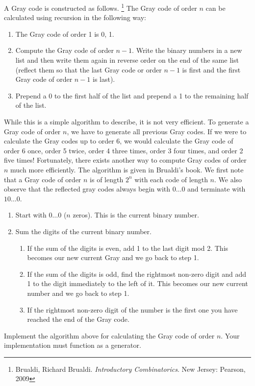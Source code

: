 A Gray code is constructed as follows.
\footnote{Brualdi, Richard Brualdi. \emph{Introductory Combinatorics}. New Jersey: Pearson, 2009}
The Gray code of order $n$ can be calculated using recursion in the following way:
\begin{enumerate}
\item The Gray code of order 1 is 0, 1.
\item Compute the Gray code of order $n-1$.  Write the binary numbers in a new list and then write them again in reverse order on the end of the same list (reflect them so that the last Gray code or order $n-1$ is first and the first Gray code of order $n-1$ is last).
\item Prepend a 0 to the first half of the list and prepend a 1 to the remaining half of the list.
\end{enumerate}
While this is a simple algorithm to describe, it is not very efficient.  
To generate a Gray code of order $n$, we have to generate all previous Gray codes.
If we were to calculate the Gray codes up to order 6, we would calculate the Gray code of order 6 once, order 5 twice, order 4 three times, order 3 four times, and order 2 five times!
Fortunately, there exists another way to compute Gray codes of order $n$ much more efficiently.
The algorithm is given in Brualdi's book.  
We first note that a Gray code of order $n$ is of length $2^n$ with each code of length $n$.
We also observe that the reflected gray codes always begin with $0\dots0$ and terminate with $10\dots0$.
\begin{enumerate}
\item Start with $0\dots0$ ($n$ zeros).  This is the current binary number.
\item Sum the digits of the current binary number.
\begin{enumerate}
\item If the sum of the digits is even, add 1 to the last digit mod 2.
This becomes our new current Gray and we go back to step 1.
\item If the sum of the digits is odd, find the rightmost non-zero digit and add 1 to the digit immediately to the left of it.
This becomes our new current number and we go back to step 1.
\item If the rightmost non-zero digit of the number is the first one you have reached the end of the Gray code.
\end{enumerate}
\end{enumerate}

\begin{problem}
\label{prob:brualdi_gray}
Implement the algorithm above for calculating the Gray code of order $n$.
Your implementation must function as a generator.
\end{problem}

